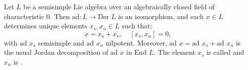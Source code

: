Let $L$ be a semisimple Lie algebra over an algebraically closed field of characteristic 0. Then $\text{ad}: L \rightarrow \text{Der } L$ is an isomorphism, and each $x \in L$ determines unique elements $x_s, x_n \in L$ such that:
$$x = x_s + x_n, \quad [x_s, x_n] = 0,$$
with $\text{ad } x_s$ semisimple and $\text{ad } x_n$ nilpotent. Moreover, $\text{ad } x = \text{ad } x_s + \text{ad } x_n$ is the usual Jordan decomposition of $\text{ad } x$ in $\text{End } L$. The element $x_s$ is called  and $x_n$ is .
